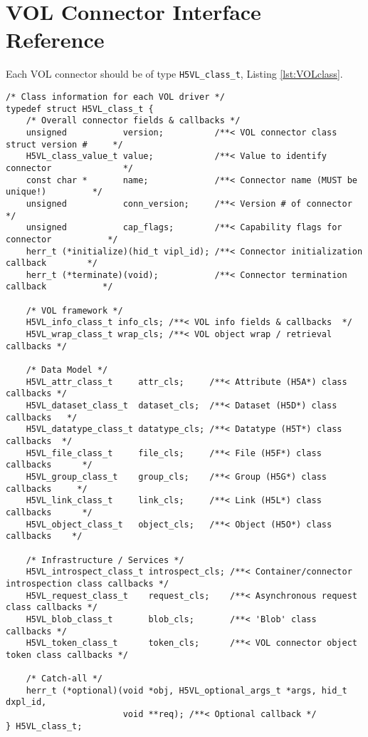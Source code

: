 \section{VOL Connector Interface Reference}
\label{sec:vol}
Each VOL connector should be of type \texttt{H5VL\_class\_t}, Listing \ref{lst:VOLclass}.

\hfill

\begin{lstlisting}[caption={VOL connector class, H5VLpublic.h},captionpos=b, label={lst:VOLclass}]
/* Class information for each VOL driver */
typedef struct H5VL_class_t {
    /* Overall connector fields & callbacks */
    unsigned           version;          /**< VOL connector class struct version #     */
    H5VL_class_value_t value;            /**< Value to identify connector              */
    const char *       name;             /**< Connector name (MUST be unique!)         */
    unsigned           conn_version;     /**< Version # of connector                   */
    unsigned           cap_flags;        /**< Capability flags for connector           */
    herr_t (*initialize)(hid_t vipl_id); /**< Connector initialization callback        */
    herr_t (*terminate)(void);           /**< Connector termination callback           */

    /* VOL framework */
    H5VL_info_class_t info_cls; /**< VOL info fields & callbacks  */
    H5VL_wrap_class_t wrap_cls; /**< VOL object wrap / retrieval callbacks */

    /* Data Model */
    H5VL_attr_class_t     attr_cls;     /**< Attribute (H5A*) class callbacks */
    H5VL_dataset_class_t  dataset_cls;  /**< Dataset (H5D*) class callbacks   */
    H5VL_datatype_class_t datatype_cls; /**< Datatype (H5T*) class callbacks  */
    H5VL_file_class_t     file_cls;     /**< File (H5F*) class callbacks      */
    H5VL_group_class_t    group_cls;    /**< Group (H5G*) class callbacks     */
    H5VL_link_class_t     link_cls;     /**< Link (H5L*) class callbacks      */
    H5VL_object_class_t   object_cls;   /**< Object (H5O*) class callbacks    */

    /* Infrastructure / Services */
    H5VL_introspect_class_t introspect_cls; /**< Container/connector introspection class callbacks */
    H5VL_request_class_t    request_cls;    /**< Asynchronous request class callbacks */
    H5VL_blob_class_t       blob_cls;       /**< 'Blob' class callbacks */
    H5VL_token_class_t      token_cls;      /**< VOL connector object token class callbacks */

    /* Catch-all */
    herr_t (*optional)(void *obj, H5VL_optional_args_t *args, hid_t dxpl_id,
                       void **req); /**< Optional callback */
} H5VL_class_t;

\end{lstlisting}

